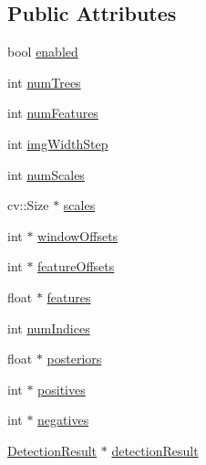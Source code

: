 \subsection*{Public Attributes}
\begin{DoxyCompactItemize}
\item 
bool \hyperlink{classtld_1_1_ensemble_classifier_a539d429a773ec9b2b86946fddb39ac52}{enabled}
\item 
int \hyperlink{classtld_1_1_ensemble_classifier_a60e802769e79c833d1484d96bb345b7c}{numTrees}
\item 
int \hyperlink{classtld_1_1_ensemble_classifier_a176aba4e90f0b9373d8aedd7c25fa262}{numFeatures}
\item 
int \hyperlink{classtld_1_1_ensemble_classifier_a149e36a3d0d287ee804ec7cf92dc6569}{imgWidthStep}
\item 
int \hyperlink{classtld_1_1_ensemble_classifier_ae10dcd7614a39f9b29b3fbe957889fb9}{numScales}
\item 
cv::Size $\ast$ \hyperlink{classtld_1_1_ensemble_classifier_ae2ea00a933d9c96498ba756a2b4ec6b5}{scales}
\item 
int $\ast$ \hyperlink{classtld_1_1_ensemble_classifier_abc6ed3b991a724b07dfcc25108769e92}{windowOffsets}
\item 
int $\ast$ \hyperlink{classtld_1_1_ensemble_classifier_acf42e105ca1cb616aaf2d8e4d8755c41}{featureOffsets}
\item 
float $\ast$ \hyperlink{classtld_1_1_ensemble_classifier_a02deffee640b4106051024d1ae8a55aa}{features}
\item 
int \hyperlink{classtld_1_1_ensemble_classifier_afbfbda1b693525895467fba88a8debe3}{numIndices}
\item 
float $\ast$ \hyperlink{classtld_1_1_ensemble_classifier_a34092918268be97eb1e1f2f0fc7d4254}{posteriors}
\item 
int $\ast$ \hyperlink{classtld_1_1_ensemble_classifier_a572549e31f9bfc34c7b464e02aa41397}{positives}
\item 
int $\ast$ \hyperlink{classtld_1_1_ensemble_classifier_a2de7561eb20a0f0a1b4909d6dfd89d0b}{negatives}
\item 
\hyperlink{classtld_1_1_detection_result}{DetectionResult} $\ast$ \hyperlink{classtld_1_1_ensemble_classifier_af57e5de2c583e7f1cf39e6de03159323}{detectionResult}
\end{DoxyCompactItemize}


